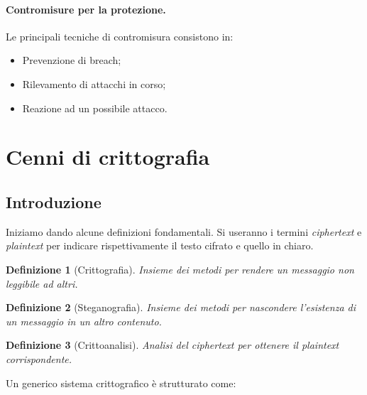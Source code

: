 \documentclass[a4paper, 10pt, twoside]{article}
\newtheorem{definit}{Definizione}[subsection]
\begin{document}
	\paragraph{Contromisure per la protezione.} Le principali tecniche di contromisura consistono in:\begin{itemize}
		\item Prevenzione di breach;
		\item Rilevamento di attacchi in corso;
		\item Reazione ad un possibile attacco.
		\end{itemize}
		
	\section{Cenni di crittografia}
	\subsection{Introduzione}
	Iniziamo dando alcune definizioni fondamentali. Si useranno i termini \textit{ciphertext} e \textit{plaintext} per indicare rispettivamente il testo cifrato e quello in chiaro.
	
	\begin{definit}[Crittografia]
	Insieme dei metodi per rendere un messaggio non leggibile ad altri.
	\end{definit}
	
	\begin{definit}[Steganografia]
	Insieme dei metodi per nascondere l'esistenza di un messaggio in un altro contenuto.
	\end{definit}
	
	\begin{definit}[Crittoanalisi]
	Analisi del ciphertext per ottenere il plaintext corrispondente.
	\end{definit}
					
	Un generico sistema crittografico è strutturato come: \\
	
	
\end{document}
